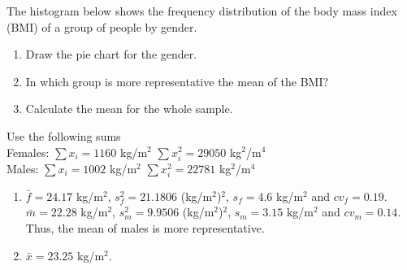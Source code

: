 {The histogram below shows the frequency distribution of the body mass index (BMI) of a group of people by gender.
\begin{center}
\resizebox{0.6\textwidth}{!}{}
\end{center}

\begin{enumerate}
\item Draw the pie chart for the gender.
\item In which group is more representative the mean of the BMI?
\item Calculate the mean for the whole sample.
\end{enumerate}
Use the following sums\\
Females: $\sum x_i=1160$ kg/m$^2$ \quad $\sum x_i^2 = 29050$ kg$^2$/m$^4$\\
Males: $\sum x_i=1002$ kg/m$^2$ \quad $\sum x_i^2 = 22781$ kg$^2$/m$^4$
}
{\begin{enumerate}[start=2]
\item $\bar{f} =24.17$ kg/m$^2$, $s_{f}^2=21.1806$ (kg/m$^2$)$^2$, $s_f=4.6$ kg/m$^2$ and $cv_f = 0.19$.\\
$\bar{m} =22.28$ kg/m$^2$, $s_{m}^2=9.9506$ (kg/m$^2$)$^2$, $s_m=3.15$ kg/m$^2$ and $cv_m = 0.14$.
Thus, the mean of males is more representative.
\item $\bar{x}=23.25$ kg/m$^2$.
\end{enumerate}
}
